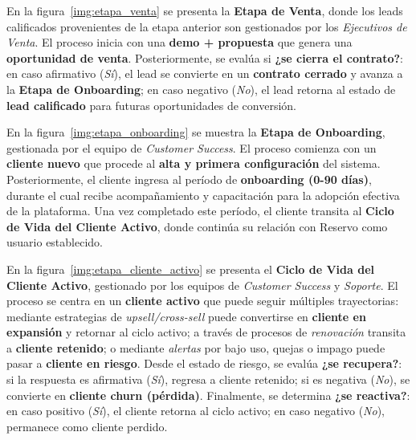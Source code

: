 
En la figura~\ref{img:etapa_venta} se presenta la \textbf{Etapa de Venta}, donde los leads calificados provenientes de la etapa anterior son gestionados por los \textit{Ejecutivos de Venta}. El proceso inicia con una \textbf{demo + propuesta} que genera una \textbf{oportunidad de venta}. Posteriormente, se evalúa si \textbf{¿se cierra el contrato?}: en caso afirmativo (\textit{Sí}), el lead se convierte en un \textbf{contrato cerrado} y avanza a la \textbf{Etapa de Onboarding}; en caso negativo (\textit{No}), el lead retorna al estado de \textbf{lead calificado} para futuras oportunidades de conversión.


En la figura~\ref{img:etapa_onboarding} se muestra la \textbf{Etapa de Onboarding}, gestionada por el equipo de \textit{Customer Success}. El proceso comienza con un \textbf{cliente nuevo} que procede al \textbf{alta y primera configuración} del sistema. Posteriormente, el cliente ingresa al período de \textbf{onboarding (0-90 días)}, durante el cual recibe acompañamiento y capacitación para la adopción efectiva de la plataforma. Una vez completado este período, el cliente transita al \textbf{Ciclo de Vida del Cliente Activo}, donde continúa su relación con Reservo como usuario establecido.


En la figura~\ref{img:etapa_cliente_activo} se presenta el \textbf{Ciclo de Vida del Cliente Activo}, gestionado por los equipos de \textit{Customer Success} y \textit{Soporte}. El proceso se centra en un \textbf{cliente activo} que puede seguir múltiples trayectorias: mediante estrategias de \textit{upsell/cross-sell} puede convertirse en \textbf{cliente en expansión} y retornar al ciclo activo; a través de procesos de \textit{renovación} transita a \textbf{cliente retenido}; o mediante \textit{alertas} por bajo uso, quejas o impago puede pasar a \textbf{cliente en riesgo}. Desde el estado de riesgo, se evalúa \textbf{¿se recupera?}: si la respuesta es afirmativa (\textit{Sí}), regresa a cliente retenido; si es negativa (\textit{No}), se convierte en \textbf{cliente churn (pérdida)}. Finalmente, se determina \textbf{¿se reactiva?}: en caso positivo (\textit{Sí}), el cliente retorna al ciclo activo; en caso negativo (\textit{No}), permanece como cliente perdido.


